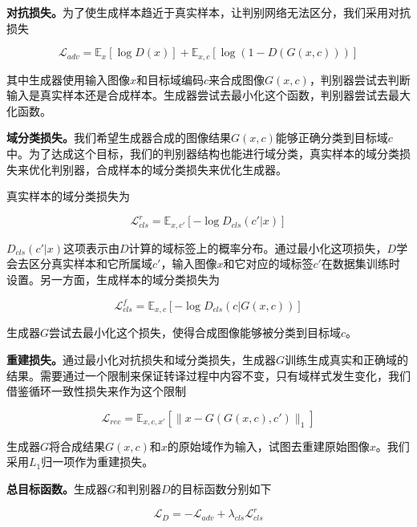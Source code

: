 \textbf{对抗损失。}为了使生成样本趋近于真实样本，让判别网络无法区分，我们采用对抗损失 

\begin{equation}
\label{equ:adv_exp2}
\mathcal{L}_{adv} = \mathbb{E}_x[\log D(x)] + \mathbb{E}_{x,c}[\log(1-D(G(x,c)))]
\end{equation}

其中生成器使用输入图像$x$和目标域编码$c$来合成图像$G(x,c)$，判别器尝试去判断输入是真实样本还是合成样本。生成器尝试去最小化这个函数，判别器尝试去最大化函数。

\textbf{域分类损失。}我们希望生成器合成的图像结果$G(x,c)$能够正确分类到目标域$c$中。为了达成这个目标，我们的判别器结构也能进行域分类，真实样本的域分类损失来优化判别器，合成样本的域分类损失来优化生成器。

真实样本的域分类损失为

\begin{equation}
\label{equ:cls_real_exp2}
\mathcal{L}_{cls}^{r} = \mathbb{E}_{x,c'}[-\log D_{cls}(c'|x)]
\end{equation}

$D_{cls}(c'|x)$这项表示由$D$计算的域标签上的概率分布。通过最小化这项损失，$D$学会去区分真实样本和它所属域$c'$，输入图像$x$和它对应的域标签$c'$在数据集训练时设置。另一方面，生成样本的域分类损失为

\begin{equation}
\label{equ:cls_fake_exp2}
\mathcal{L}_{cls}^{f} = \mathbb{E}_{x,c}[-\log D_{cls}(c|G(x,c))]
\end{equation}

生成器$G$尝试去最小化这个损失，使得合成图像能够被分类到目标域$c$。

\textbf{重建损失。}通过最小化对抗损失和域分类损失，生成器$G$训练生成真实和正确域的结果。需要通过一个限制来保证转译过程中内容不变，只有域样式发生变化，我们借鉴循环一致性损失来作为这个限制

\begin{equation}
\label{equ:rec_exp2}
\mathcal{L}_{rec} = \mathbb{E}_{x,c,x'}[\| x-G(G(x,c),c') \|_1]
\end{equation}

生成器$G$将合成结果$G(x,c)$和$x$的原始域作为输入，试图去重建原始图像$x$。我们采用$L_1$归一项作为重建损失。

\textbf{总目标函数。}生成器$G$和判别器$D$的目标函数分别如下

\begin{equation}
\label{equ:D_exp2}
\mathcal{L}_{D} = -\mathcal{L}_{adv} + \lambda_{cls}\mathcal{L}_{cls}^{r}
\end{equation}

